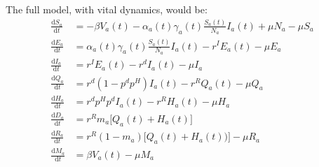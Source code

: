 \documentclass{article}
\begin{document}
The full model, with vital dynamics, would be:\\
\begin{align}
    \frac{\text{d}S_a}{\text{d}t}&=  -\beta V_a(t) - \alpha_a(t) \gamma_a(t)\frac{S_a(t)}{N_a}I_a(t) + \mu N_a - \mu S_a \label{eq:start-vital}\\
     \frac{\text{d}E_a}{\text{d}t} &= \alpha_a(t) \gamma_a(t)\frac{S_a(t)}{N_a}I_a(t) -r^IE_a(t) - \mu E_a \\
     \frac{\text{d}I_a}{\text{d}t}&= r^IE_a(t) - r^dI_a(t)- \mu I_a\\
    \frac{\text{d}Q_a}{\text{d}t} &= r^d(1-p^dp^H)I_a(t) - r^RQ_a(t) - \mu Q_a \\
    \frac{\text{d}H_a}{\text{d}t} &= r^dp^Hp^dI_a(t) - r^RH_a(t) - \mu H_a\\
    \frac{\text{d}D_a}{\text{d}t} &= r^Rm_a\Big[Q_a(t)+H_a(t)\Big]\\
    \frac{\text{d}R_a}{\text{d}t} &= r^R(1-m_a)\Big[Q_a(t)+H_a(t))\Big] - \mu R_a\\
    \frac{\text{d}M_a}{\text{d}t} &= \beta V_a(t) - \mu M_a \label{eq:end-vital}
\end{align}
\end{document}
